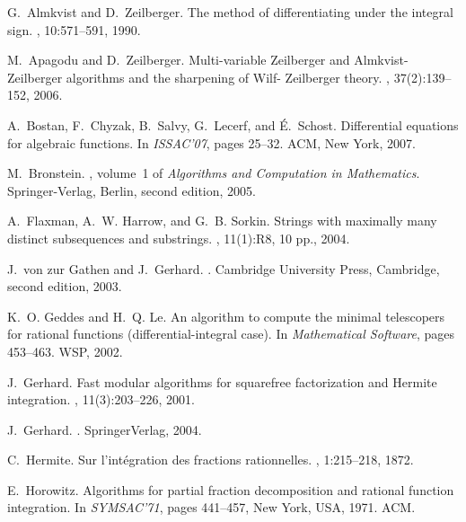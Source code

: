 \documentclass{sig-alt-full}
\def\gathen#1{{#1}}
\begin{document}
{\scriptsize



\begin{thebibliography}{10}

G.~Almkvist and D.~Zeilberger.
\newblock The method of differentiating under the integral sign.
, 10:571--591, 1990.

M.~Apagodu and D.~Zeilberger.
\newblock Multi-variable {Z}eilberger and {A}lmkvist-{Z}eilberger algorithms
  and the sharpening of {W}ilf-{} {Z}eilberger theory.
, 37(2):139--152, 2006.

A.~Bostan, F.~Chyzak, B.~Salvy, G.~Lecerf, and {\'E}.~Schost.
\newblock Differential equations for algebraic functions.
\newblock In {\em I{SSAC}'07}, pages 25--32. ACM, New York, 2007.

M.~Bronstein.
,
  volume~1 of {\em Algorithms and Computation in Mathematics}.
\newblock Springer-Verlag, Berlin, second edition, 2005.

A.~Flaxman, A.~W. Harrow, and G.~B. Sorkin.
\newblock Strings with maximally many distinct subsequences and substrings.
, 11(1):R8, 10 pp., 2004.

J.~\gathen{von zur} Gathen and J.~Gerhard.
.
\newblock Cambridge University Press, Cambridge, second edition, 2003.

K.~O. Geddes and H.~Q. Le.
\newblock An algorithm to compute the minimal telescopers for rational
  functions (differential-integral case).
\newblock In {\em Mathematical Software}, pages 453--463. WSP, 2002.

J.~Gerhard.
\newblock Fast modular algorithms for squarefree factorization and {H}ermite
  integration.
, 11(3):203--226, 2001.

J.~Gerhard.
.
\newblock SpringerVerlag, 2004.

C.~Hermite.
\newblock Sur l'int\'egration des fractions rationnelles.
, 1:215--218, 1872.

E.~Horowitz.
\newblock Algorithms for partial fraction decomposition and rational function
  integration.
\newblock In {\em SYMSAC'71}, pages 441--457, New York, USA, 1971. ACM.


\end{thebibliography}}
\end{document}
